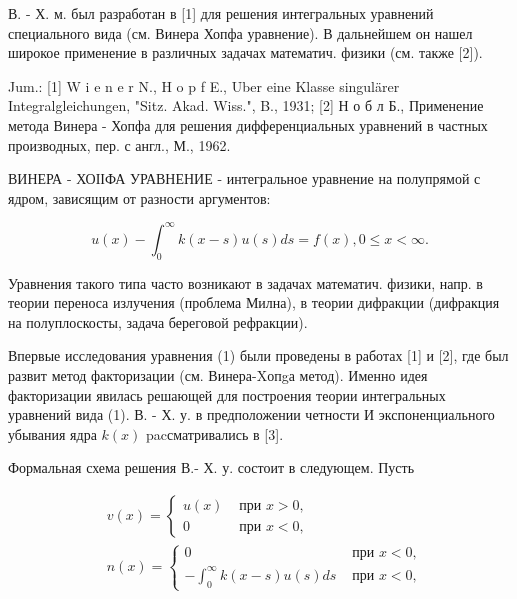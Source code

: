 \documentclass[10pt]{article}
\begin{document}
В. - Х. м. был разработан в [1] для решения интегральных уравнений специального вида (см. Винера Хопфа уравнение). В дальнейшем он нашел широкое применение в различных задачах математич. физики (см. также [2]).



Jum.: [1] W i e n e r N., H o p f E., Uber eine Klasse singulärer Integralgleichungen, "Sitz. Akad. Wiss.", B., 1931; [2] Н о б л Б., Применение метода Винера - Хопфа для решения дифференциальных уравнений в частных производных, пер. с англ., М., 1962.



ВИНЕРА - ХОІІФА УРАВНЕНИЕ - интегральное уравнение на полупрямой с ядром, зависящим от разности аргументов:



\[

u(x)-\int_{0}^{\infty} k(x-s) u(s) d s=f(x), 0 \leqslant x<\infty .

\]



Уравнения такого типа часто возникают в задачах математич. физики, напр. в теории переноса излучения (проблема Милна), в теории дифракции (дифракция на полуплоскосты, задача береговой рефракции).



Впервые исследования уравнения (1) были проведены в работах [1] и [2], где был развит метод факторизации (см. Винера-Xопgа метод). Именно идея факторизации явилась решающей для построения теории интегральных уравнений вида (1). В. - Х. у. в предположении четности И экспоненциального убывания ядра $k(x)$ pacсматривались в [3].



Формальная схема решения В.- Х. у. состоит в следующем. Пусть



\[

\begin{aligned}

& v(x)= \begin{cases}u(x) & \text { при } x>0, \\

0 & \text { при } x<0,\end{cases} \\

& n(x)=\left\{\begin{array}{cc}

0 & \text { при } x<0, \\

-\int_{0}^{\infty} k(x-s) u(s) d s & \text { при } x<0,

\end{array}\right.

\end{aligned}

\]
\end{document}
